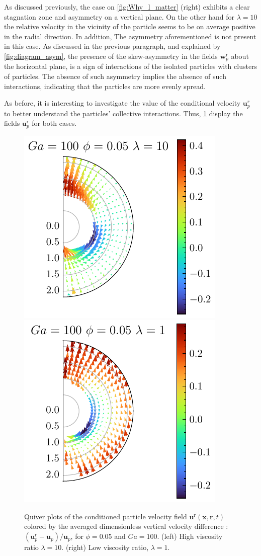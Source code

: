 As discussed previously, the case on \ref{fig:Why_l_matter} (right) exhibits a clear stagnation zone and asymmetry on a vertical plane. 
On the other hand for $\lambda =10$ the relative velocity in the vicinity of the particle seems to be on average positive in the radial direction. 
In addition, The asymmetry aforementioned is not present in this case. 
As discussed in the previous paragraph, and explained by \ref{fig:diagram_asym}, the presence of the skew-asymmetry in the fields $\textbf{w}_p^\text{r}$ about the horizontal plane, is a sign of interactions of the isolated particles with clusters of particles.
The absence of such asymmetry implies the absence of such interactions, indicating that the particles are more evenly spread. 

As before, it is interesting to investigate the value of the conditional velocity $\textbf{u}^r_p$ to better understand the particles' collective interactions. 
Thus, \ref{fig:unst_l} display the fields  $\textbf{u}_p^\text{r}$ for both cases. 
\begin{figure}[h!]
    \centering
    \includegraphics[height=0.35\textwidth]{image/HOMOGENEOUS_NEW/Dist/U_l_10_Ga_100_PHI_5.pdf}
    \includegraphics[height=0.35\textwidth]{image/HOMOGENEOUS_NEW/Dist/U_l_1_Ga_100_PHI_5.pdf}
    \caption{
         Quiver plots of the conditioned particle velocity field $\textbf{u}^\text{r}(\textbf{x},\textbf{r},t)$ colored by the averaged dimensionless vertical velocity difference : $(\textbf{u}^\text{r}_p - \textbf{u}_p )/ \textbf{u}_p$, for $\phi = 0.05$ and $Ga = 100$. 
         (left) High viscosity ratio $\lambda = 10$.
         (right) Low viscosity ratio, $\lambda = 1$.
         }
    \label{fig:unst_l}
\end{figure}
